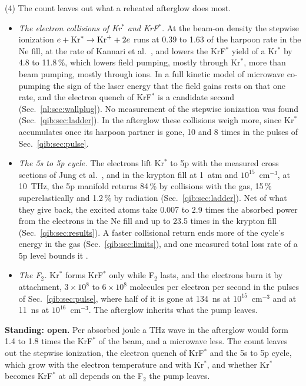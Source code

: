 {\noindent}(4) The count leaves out what a reheated afterglow does most.
\begin{itemize}
\item \emph{The electron collisions of Kr$^*$ and KrF$^*$.} At the beam-on density the
  stepwise ionization $e+{\rm Kr}^*\to{\rm Kr}^++2e$ runs at 0.39 to 1.63 of the harpoon
  rate in the Ne fill, at the rate of Kannari et al.\ \cite{p1:Kannari1985}, and lowers
  the KrF$^*$ yield of a Kr$^*$ by 4.8 to 11.8\,\%, which lowers field pumping, mostly
  through Kr$^*$, more than beam pumping, mostly through ions. In a full kinetic model of
  microwave co-pumping the sign of the laser energy that the field gains rests on that
  one rate, and the electron quench of KrF$^*$ is a candidate second
  (Sec.~\ref{nl:sec:wallplug}). No measurement of the stepwise ionization was found
  (Sec.~\ref{qib:sec:ladder}). In the afterglow these collisions weigh more, since
  Kr$^*$ accumulates once its harpoon partner is gone, 10 and 8 times in the pulses of
  Sec.~\ref{qib:sec:pulse}.
\item \emph{The 5s to 5p cycle.} The electrons lift Kr$^*$ to 5p with the measured cross
  sections of Jung et al.\ \cite{p1:Jung2005}, and in the krypton fill at 1~atm and
  $10^{15}$~cm$^{-3}$, at 10~THz, the 5p manifold returns 84\,\% by collisions with the
  gas, 15\,\% superelastically and 1.2\,\% by radiation (Sec.~\ref{qib:sec:ladder}). Net
  of what they give back, the excited atoms take 0.007 to 2.9 times the absorbed power
  from the electrons in the Ne fill and up to 23.5 times in the krypton fill
  (Sec.~\ref{qib:sec:results}). A faster collisional return ends more of the cycle's
  energy in the gas (Sec.~\ref{qib:sec:limits}), and one measured total loss rate of a
  5p level bounds it \cite{p1:Gazeli2021}.
\item \emph{The F$_2$.} Kr$^*$ forms KrF$^*$ only while F$_2$ lasts, and the electrons
  burn it by attachment, $3\times10^{8}$ to $6\times10^{8}$ molecules per electron per
  second in the pulses of Sec.~\ref{qib:sec:pulse}, where half of it is gone at 134~ns at
  $10^{15}$~cm$^{-3}$ and at 11~ns at $10^{16}$~cm$^{-3}$. The afterglow inherits what
  the pump leaves.
\end{itemize}

\medskip
\noindent\textbf{Standing: open.} Per absorbed joule a THz wave in the afterglow would
form 1.4 to 1.8 times the KrF$^*$ of the beam, and a microwave less. The count leaves
out the stepwise ionization, the electron quench of KrF$^*$ and the 5s to 5p cycle,
which grow with the electron temperature and with Kr$^*$, and whether Kr$^*$ becomes
KrF$^*$ at all depends on the F$_2$ the pump leaves.

